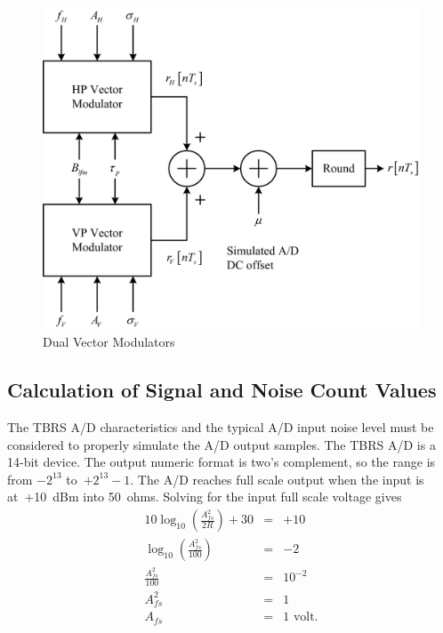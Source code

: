 \documentclass[12pt,english]{article}
\newcommand{\lp}{\left(}
\newcommand{\rp}{\right)}
\begin{document}
\begin{figure}[htbp]
  \noindent \begin{centering}
  \includegraphics[width=5.0in]{TbrsDualVM.png}\medskip{}
  \caption{Dual Vector Modulators}
  \label{fig:TbrsDualVM}
  \par \end{centering}
\end{figure}

\subsection{Calculation of Signal and Noise Count Values}

The TBRS A/D characteristics and the typical A/D input noise level
must be considered to properly simulate the A/D output samples. The
TBRS A/D is a 14-bit device. The output numeric format is two's
complement, so the range is from $-2^{13}$ to~$+2^{13}-1$. The A/D
reaches full scale output when the input is at~+10~dBm into 50~ohms.
Solving for the input full scale voltage gives
\begin{eqnarray}
  10 \log_{10} \lp \frac{A_{fs}^2}{2R} \rp + 30 &=& +10 \\
  \log_{10} \lp \frac{A_{fs}^2}{100} \rp &=& -2 \nonumber\\
  \frac{A_{fs}^2}{100} &=& 10^{-2} \nonumber\\
  A_{fs}^2 &=& 1 \nonumber\\
  A_{fs} &=& 1 \mbox{ volt.} \nonumber
\end{eqnarray}
\end{document}
